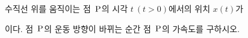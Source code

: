 수직선 위를 움직이는 점~$\mathrm{P}$의 시각 $t\ (t>0)$에서의 위치 $x(t)$가 \par\smallskip{}\par\smallskip\noindent 이다. 점~$\mathrm{P}$의 운동 방향이 바뀌는 순간 점~$\mathrm{P}$의 가속도를 구하시오.
